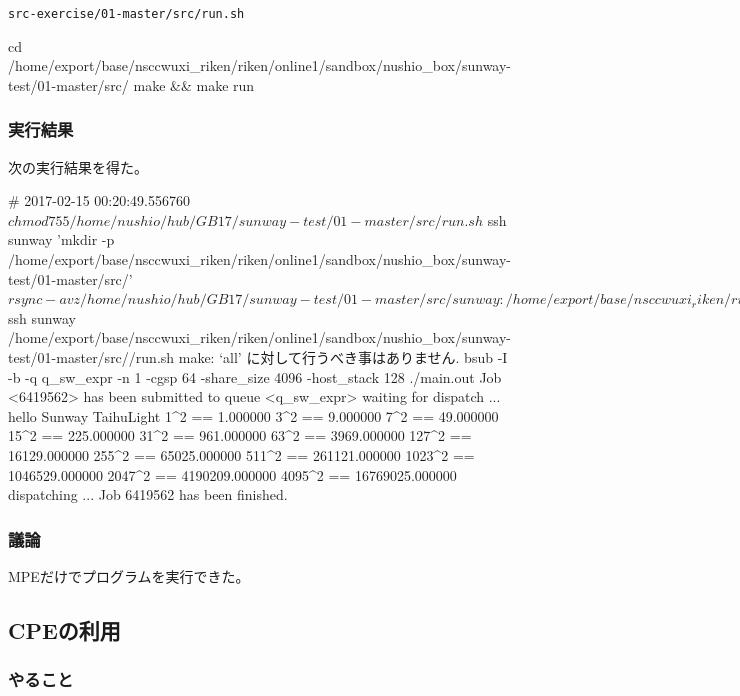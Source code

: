 \verb`src-exercise/01-master/src/run.sh`
\begin{code}

cd /home/export/base/nsccwuxi_riken/riken/online1/sandbox/nushio_box/sunway-test/01-master/src/
make && make run
    
\end{code}

\subsubsection{実行結果}

次の実行結果を得た。

\begin{code}
# 2017-02-15 00:20:49.556760
$ chmod 755 /home/nushio/hub/GB17/sunway-test/01-master/src/run.sh
$ ssh sunway 'mkdir -p /home/export/base/nsccwuxi_riken/riken/online1/sandbox/nushio_box/sunway-test/01-master/src/'
$ rsync -avz /home/nushio/hub/GB17/sunway-test/01-master/src/ sunway:/home/export/base/nsccwuxi_riken/riken/online1/sandbox/nushio_box/sunway-test/01-master/src/
sending incremental file list
./
Makefile
run.sh

sent 436 bytes  received 72 bytes  145.14 bytes/sec
total size is 955  speedup is 1.88
$ ssh sunway /home/export/base/nsccwuxi_riken/riken/online1/sandbox/nushio_box/sunway-test/01-master/src//run.sh
make: `all' に対して行うべき事はありません.
bsub -I -b -q q_sw_expr -n 1 -cgsp 64 -share_size 4096 -host_stack 128 ./main.out
Job <6419562> has been submitted to queue <q_sw_expr>
waiting for dispatch ...
hello Sunway TaihuLight
1^2 == 1.000000
3^2 == 9.000000
7^2 == 49.000000
15^2 == 225.000000
31^2 == 961.000000
63^2 == 3969.000000
127^2 == 16129.000000
255^2 == 65025.000000
511^2 == 261121.000000
1023^2 == 1046529.000000
2047^2 == 4190209.000000
4095^2 == 16769025.000000
dispatching ...
Job 6419562 has been finished.

\end{code}

\subsubsection{議論}

MPEだけでプログラムを実行できた。


\subsection{CPEの利用}
\subsubsection{やること}

